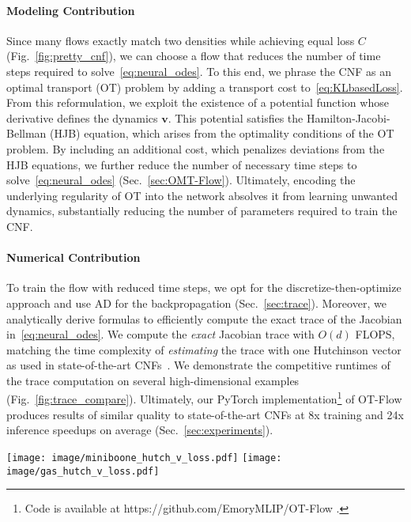 \documentclass[letterpaper]{article}
\newcommand{\bfv}{\mathbf{v}}
\newcommand{\model}{OT-Flow} %
\begin{document}
	\paragraph{Modeling Contribution}
	Since many flows exactly match two densities while achieving equal loss $C$ (Fig.~\ref{fig:pretty_cnf}), we can choose a flow that reduces the number of time steps required to solve~\eqref{eq:neural_odes}. 
	To this end, we phrase the CNF as an optimal transport (OT) problem by adding a transport cost to~\eqref{eq:KLbasedLoss}. 
    From this reformulation, we exploit the existence of a potential function whose derivative defines the dynamics $\bfv$.
    This potential satisfies the Hamilton-Jacobi-Bellman (HJB) equation, which arises from the optimality conditions of the OT problem. 
    By including an additional cost, which penalizes deviations from the HJB equations, we further reduce the number of necessary time steps to solve~\eqref{eq:neural_odes} (Sec.~\ref{sec:OMT-Flow}).
	Ultimately, encoding the underlying regularity of OT into the network absolves it from learning unwanted dynamics, substantially reducing the number of parameters required to train the CNF.
	
	
	\paragraph{Numerical Contribution}
	To train the flow with reduced time steps, we opt for the discretize-then-optimize approach and use AD for the backpropagation (Sec.~\ref{sec:trace}).
	Moreover, we analytically derive formulas to efficiently compute the exact trace of the Jacobian in~\eqref{eq:neural_odes}.
	We compute the \emph{exact} Jacobian trace with $O(d)$ FLOPS, matching the time complexity of \emph{estimating} the trace with one Hutchinson vector as used in state-of-the-art CNFs~\cite{grathwohl2019ffjord,finlay2020train}.
	We demonstrate the competitive runtimes of the trace computation on several high-dimensional examples (Fig.~\ref{fig:trace_compare}).
	Ultimately, our PyTorch implementation\footnote{Code is available at https://github.com/EmoryMLIP/OT-Flow .}
	of \model{} produces results of similar quality to state-of-the-art CNFs at 8x training and 24x inference speedups on average (Sec.~\ref{sec:experiments}).

  

	\begin{figure*}[t]
	  \centering
		\texttt{[image: image/miniboone\_hutch\_v\_loss.pdf]} \quad
		\texttt{[image: image/gas\_hutch\_v\_loss.pdf]}
	  \caption{The exact trace computation in \model{} leads to faster decay of validation loss and lower training loss variance compared to an identical model using a randomized trace estimator (also used in FFJORD and RNODE) for two data sets.}
	  \label{fig:hutch}
	\end{figure*}
\end{document}
